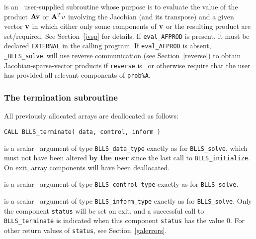 \documentclass{galahad}
\newcommand{\packagename}{BLLS}
\newcommand{\fullpackagename}{\libraryname\_\packagename}
\newcommand{\solver}{{\tt \fullpackagename\_solve}}
\begin{document}
\begin{description}
 is an \optional\
user-supplied subroutine whose purpose is to evaluate the value of the
product ${\mathbf{A}} {\mathbf{v}}$ or ${\mathbf{A}}^T v$ involving the Jacobian (and its transpose)
and a given vector ${\mathbf{v}}$ in which either only some components of ${\mathbf{v}}$ or
the resulting product are set/required.
See Section~\ref{jvsp} for details.
If {\tt eval\_AFPROD} is present,
it must be declared {\tt EXTERNAL} in the calling program.
If {\tt eval\_AFPROD} is absent, \solver\ will use reverse communication
(see Section~\ref{reverse})
to obtain Jacobian-sparse-vector products if {\tt reverse} is \present\ or
otherwise require that the user has provided all relevant
components of {\tt prob\%A}.


\end{description}


\subsubsection{The  termination subroutine}
All previously allocated arrays are deallocated as follows:
\vspace*{1mm}

\hspace{8mm}
{\tt CALL \packagename\_terminate( data, control, inform )}

\vspace*{-3mm}
\begin{description}

 is a scalar \intentinout\ argument of type
{\tt \packagename\_data\_type}
exactly as for
{\tt \packagename\_solve},
which must not have been altered {\bf by the user} since the last call to
{\tt \packagename\_initialize}.
On exit, array components will have been deallocated.

 is a scalar \intentin\ argument of type
{\tt \packagename\_control\_type}
exactly as for
{\tt \packagename\_solve}.

 is a scalar \intentout\ argument of type
{\tt \packagename\_inform\_type}
exactly as for
{\tt \packagename\_solve}.
Only the component {\tt status} will be set on exit, and a
successful call to
{\tt \packagename\_terminate}
is indicated when this  component {\tt status} has the value 0.
For other return values of {\tt status}, see Section~\ref{galerrors}.

\end{description}


\end{document}
